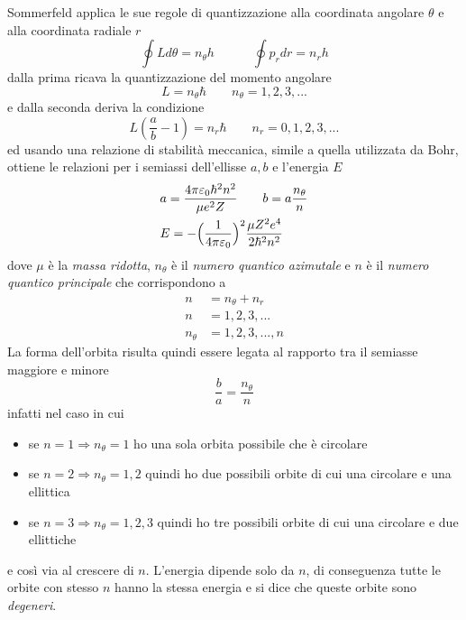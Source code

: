Sommerfeld applica le sue regole di quantizzazione alla coordinata angolare $\theta$ e alla coordinata radiale $r$
\begin{equation}
\oint L d\theta = n_{\theta} h \quad\quad \quad \oint p_r dr = n_r h
\end{equation}
dalla prima ricava la quantizzazione del momento angolare
\begin{equation}
L = n_{\theta} \hbar \quad\quad n_{\theta} = 1,2,3, ...
\end{equation}
e dalla seconda deriva la condizione
\begin{equation}
L (\frac{ a}{b } - 1) = n_r \hbar \quad\quad n_{r} = 0,1,2,3, ...
\end{equation}
ed usando una relazione di stabilità meccanica, simile a quella utilizzata da Bohr, ottiene le relazioni per i semiassi dell'ellisse $a, b$ e l'energia $E$
\begin{equation}
\begin{split}
& a = \frac{ 4\pi \varepsilon_0 \hbar^2 n^2}{\mu e^2 Z } \quad\quad b = a \frac{ n_{\theta}}{n } \\
& E = - \Bigl(  \frac{ 1}{4\pi\varepsilon_0 }  \Bigr)^2 \frac{ \mu Z^2 e^4}{2 \hbar^2 n^2 }
\end{split}
\end{equation}
dove $\mu$ è la \textit{massa ridotta}, $n_{\theta}$ è il \textit{numero quantico azimutale} e $n$ è il \textit{numero quantico principale} che corrispondono a
\begin{equation}
\begin{split}
n & = n_{\theta} + n_{r} \\
n & = 1,2,3,... \\
n_{\theta} & = 1,2,3,..., n
\end{split}
\end{equation}
La forma dell'orbita risulta quindi essere legata al rapporto tra il semiasse maggiore e minore
\begin{equation}
\frac{ b}{a } = \frac{ n_{\theta}}{n }
\end{equation}
infatti nel caso in cui
\begin{itemize}
\item se $n=1 \Rightarrow n_{\theta}=1$ ho una sola orbita possibile che è circolare
\item se $n=2 \Rightarrow n_{\theta}=1,2$ quindi ho due possibili orbite di cui una circolare e una ellittica
\item se $n=3 \Rightarrow n_{\theta}=1,2,3$ quindi ho tre possibili orbite di cui una circolare e due ellittiche
\end{itemize}
e così via al crescere di $n$.
L'energia dipende solo da $n$, di conseguenza tutte le orbite con stesso $n$ hanno la stessa energia e si dice che queste orbite sono \textit{degeneri}.

